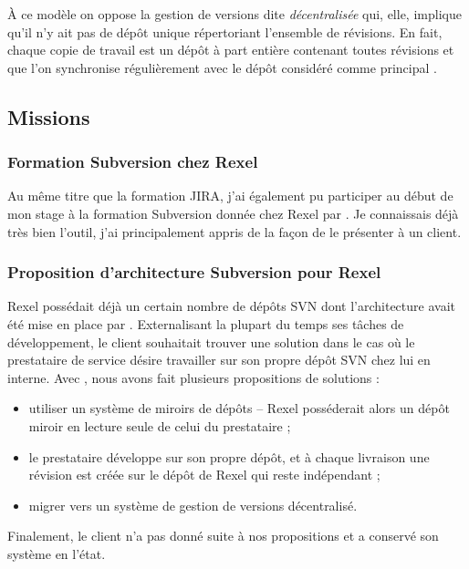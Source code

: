 À ce modèle on oppose la gestion de versions dite \emph{décentralisée} qui, elle, implique qu'il n'y ait pas de dépôt unique répertoriant l'ensemble de révisions.
En fait, chaque copie de travail est un dépôt à part entière contenant toutes révisions et que l'on synchronise régulièrement avec le dépôt considéré comme \og principal \fg.



\subsection{Missions}

\subsubsection{Formation Subversion chez Rexel}

Au même titre que la formation JIRA, j'ai également pu participer au début de mon stage à la formation Subversion donnée chez Rexel par \agulet.
Je connaissais déjà très bien l'outil, j'ai principalement appris de la façon de le présenter à un client.



\subsubsection{Proposition d'architecture Subversion pour Rexel}

Rexel possédait déjà un certain nombre de dépôts SVN dont l'architecture avait été mise en place par \asmile.
Externalisant la plupart du temps ses tâches de développement, le client souhaitait trouver une solution dans le cas où le prestataire de service désire travailler sur son propre dépôt SVN chez lui en interne.
Avec \agulet, nous avons fait plusieurs propositions de solutions :
\begin{itemize}
	\item utiliser un système de miroirs de dépôts -- Rexel posséderait alors un dépôt miroir en lecture seule de celui du prestataire ;
	\item le prestataire développe sur son propre dépôt, et à chaque livraison une révision est créée sur le dépôt de Rexel qui reste indépendant ;
	\item migrer vers un système de gestion de versions décentralisé.
\end{itemize}

Finalement, le client n'a pas donné suite à nos propositions et a conservé son système en l'état.


